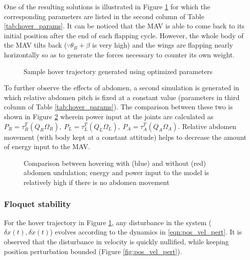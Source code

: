 \documentclass[10pt]{article}
\begin{document}
One of the resulting solutions is illustrated in Figure \ref{fig:hover_pos_vel} for which the corresponding parameters are listed in the second column of Table \ref{tab:hover_params}. It can be noticed that the MAV is able to come back to its initial position after the end of each flapping cycle. However, the whole body of the MAV tilts back ($ \because \theta_B + \beta $ is very high) and the wings are flapping nearly horizontally so as to generate the forces necessary to counter its own weight.

\begin{figure}[h!]
	\centerline{
		\hfill
	}
	\centerline{
		\hfill
	}
	\caption{Sample hover trajectory generated using optimized parameters}
	\label{fig:hover_pos_vel}
\end{figure}

To further observe the effects of abdomen, a second simulation is generated in which relative abdomen pitch is fixed at a constant value (parameters in third column of Table \ref{tab:hover_params}). The comparison between these two is shown in Figure \ref{fig:hover_comp_ab} wherein power input at the joints are calculated as $ P_R = \tau_R^T (Q_R \Omega_R),\ P_L = \tau_L^T (Q_L \Omega_L),\ P_A = \tau_A^T (Q_A \Omega_A) $. Relative abdomen movement (with body kept at a constant attitude) helps to decrease the amount of energy input to the MAV.

\begin{figure}[h!]
	\centerline{
		\hfill
	}
	\caption{Comparison between hovering with (blue) and without (red) abdomen undulation; energy and power input to the model is relatively high if there is no abdomen movement}
	\label{fig:hover_comp_ab}
\end{figure}

\subsubsection{Floquet stability}
For the hover trajectory in Figure \ref{fig:hover_pos_vel}, any disturbance in the system ($ \delta x(t), \delta \dot x(t) $) evolves according to the dynamics in \eqref{eqn:pos_vel_pert}. It is observed that the disturbance in velocity is quickly nullified, while keeping position perturbation bounded (Figure \ref{fig:pos_vel_pert}).
\end{document}
